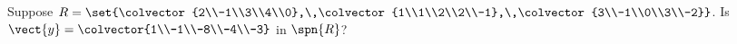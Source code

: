 Suppose $R=\set{\colvector{2\\-1\\3\\4\\0},\,\colvector{1\\1\\2\\2\\-1},\,\colvector{3\\-1\\0\\3\\-2}}$.  Is $\vect{y}=\colvector{1\\-1\\-8\\-4\\-3}$ in $\spn{R}$?